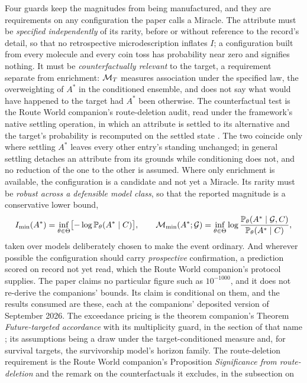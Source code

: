Four guards keep the magnitudes from being manufactured, and they are
requirements on any configuration the paper calls a Miracle. The attribute
must be \emph{specified independently} of its rarity, before or without
reference to the record's detail, so that no retrospective microdescription
inflates $I$; a configuration built from every molecule and every coin toss
has probability near zero and signifies nothing. It must be
\emph{counterfactually relevant} to the target, a requirement separate from
enrichment: $\mathcal{M}_T$ measures association under the specified law, the
overweighting of $A^\ast$ in the conditioned ensemble, and does not say what
would have happened to the target had $A^\ast$ been otherwise. The
counterfactual test is the Route World companion's route-deletion audit, read
under the framework's native settling operation, in which an attribute is
settled to its alternative and the target's probability is recomputed on the
settled state \cite{GoldenRouteWorld,Aethus}. The two coincide only where
settling $A^\ast$ leaves every other entry's standing unchanged; in general
settling detaches an attribute from its grounds while conditioning does not,
and no reduction of the one to the other is assumed. Where only enrichment is
available, the configuration is a candidate and not yet a Miracle. Its rarity must be \emph{robust across a defensible model class}, so
that the reported magnitude is a conservative lower bound,
\[
I_{\min}(A^\ast)=\inf_{\theta\in\Theta}\bigl[-\log\mathbb{P}_\theta(A^\ast\mid C)\bigr],
\qquad
\mathcal{M}_{\min}(A^\ast;\mathcal{G})=\inf_{\theta\in\Theta}\log\frac{\mathbb{P}_\theta(A^\ast\mid\mathcal{G},C)}{\mathbb{P}_\theta(A^\ast\mid C)},
\]
taken over models deliberately chosen to make the event ordinary. And
wherever possible the configuration should carry \emph{prospective}
confirmation, a prediction scored on record not yet read, which the Route
World companion's protocol supplies. The paper claims no particular figure
such as $10^{-1000}$, and it does not re-derive the companions' bounds. Its
claim is conditional on them, and the results consumed are these, each at
the companions' deposited version of September 2026. The exceedance pricing
is the theorem companion's Theorem \emph{Future-targeted accordance} with
its multiplicity guard, in the section of that name \cite{GoldenTargeted};
its assumptions being a draw under the target-conditioned measure and, for
survival targets, the survivorship model's horizon family. The route-deletion requirement is the
Route World companion's Proposition \emph{Significance from route-deletion}
and the remark on the counterfactuals it excludes, in the subsection on
